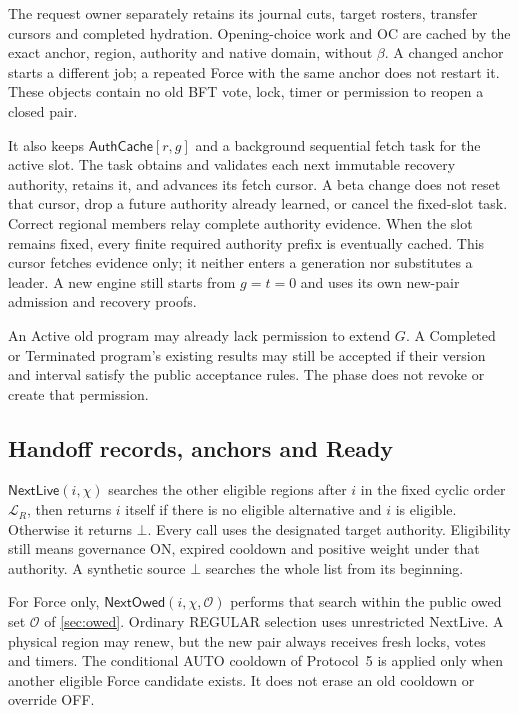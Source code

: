 \documentclass[11pt,a4paper]{article}
\newcommand{\tagg}[1]{\ensuremath{\mathsf{#1}}}
\begin{document}
The request owner separately retains its journal cuts, target rosters,
transfer cursors and completed hydration. Opening-choice work and OC are
cached by the exact anchor, region, authority and native domain, without
$\beta$. A changed anchor starts a different job; a repeated Force with
the same anchor does not restart it. These objects contain no old BFT
vote, lock, timer or permission to reopen a closed pair.

It also keeps $\tagg{AuthCache}[r,g]$ and a background sequential fetch
task for the active slot. The task obtains and validates each next
immutable recovery authority, retains it, and advances its fetch cursor.
A beta change does not reset that cursor, drop a future authority
already learned, or cancel the fixed-slot task. Correct regional
members relay complete authority evidence. When the slot remains
fixed, every finite required authority prefix is eventually cached.
This cursor fetches evidence only; it neither enters a generation nor
substitutes a leader. A new engine still starts from $g=t=0$ and uses
its own new-pair admission and recovery proofs.

An Active old program may already lack permission to extend $G$.
A Completed or Terminated program's existing results may still be
accepted if their version and interval satisfy the public acceptance
rules. The phase does not revoke or create that permission.

\subsection{Handoff records, anchors and Ready}
\label{sec:witness}
$\tagg{NextLive}(i,\chi)$ searches the other eligible regions after $i$
in the fixed cyclic order $\mathcal L_R$, then returns $i$ itself if
there is no eligible alternative and $i$ is eligible. Otherwise it
returns $\bot$. Every call uses the designated target authority.
Eligibility still means governance ON, expired cooldown and positive
weight under that authority. A synthetic source $\bot$ searches the
whole list from its beginning.

For Force only, $\tagg{NextOwed}(i,\chi,\mathcal O)$ performs that search
within the public owed set $\mathcal O$ of \cref{sec:owed}. Ordinary
REGULAR selection uses unrestricted NextLive. A physical region may
renew, but the new pair always receives fresh locks, votes and timers.
The conditional AUTO cooldown of Protocol~5 is applied only when another
eligible Force candidate exists. It does not erase an old cooldown or
override OFF.
\end{document}
